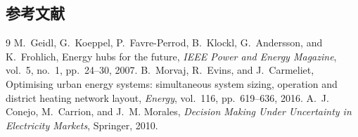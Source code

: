\subsection{参考文献}
{\renewcommand{\section}[2]{}%
\begin{thebibliography}{9}\small
{} M.~Geidl, G.~Koeppel, P.~Favre-Perrod, B.~Klockl,
G.~Andersson, and K.~Frohlich, Energy hubs for the future,
\emph{IEEE Power and Energy Magazine}, vol.~5, no.~1, pp.~24--30, 2007.
 B.~Morvaj, R.~Evins, and J.~Carmeliet,
Optimising urban energy systems: simultaneous system sizing, operation and district heating network layout,
\emph{Energy}, vol.~116, pp.~619--636, 2016.
 A.~J. Conejo, M.~Carrion, and J.~M. Morales,
\emph{Decision Making Under Uncertainty in Electricity Markets}, Springer, 2010.
\end{thebibliography}}

